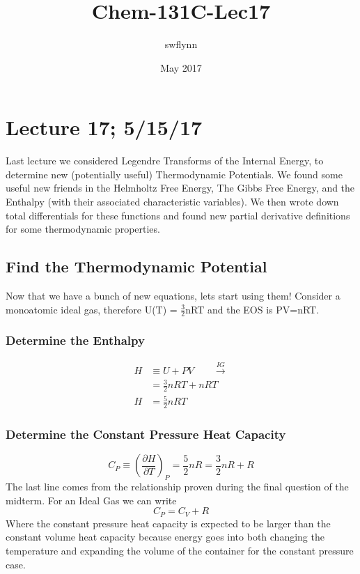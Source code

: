 \documentclass{article}
\title{Chem-131C-Lec17}
\author{swflynn}
\date{May 2017}
\begin{document}
\maketitle

\section*{Lecture 17; 5/15/17}
Last lecture we considered Legendre Transforms of the Internal Energy, to determine new (potentially useful) Thermodynamic Potentials.
We found some useful new friends in the Helmholtz Free Energy, The Gibbs Free Energy, and the Enthalpy (with their associated characteristic variables).
We then wrote down total differentials for these functions and found new partial derivative definitions for some thermodynamic properties. 

\subsection*{Find the Thermodynamic Potential}
Now that we have a bunch of new equations, lets start using them!
Consider a monoatomic ideal gas, therefore U(T) = $\frac{3}{2}$nRT and the EOS is PV=nRT.

\subsubsection*{Determine the Enthalpy}
\begin{equation}
    \begin{split}
        H &\equiv  U + PV \qquad \xrightarrow{IG} \\
        &= \frac{3}{2}nRT + nRT \\
        H &= \frac{5}{2}nRT
    \end{split}
\end{equation}

\subsubsection*{Determine the Constant Pressure Heat Capacity}
\begin{equation}
    C_P \equiv \left(\frac{\partial H}{\partial T}\right)_P = \frac{5}{2}nR = \frac{3}{2}nR + R
\end{equation}
The last line comes from the relationship proven during the final question of the midterm.
For an Ideal Gas we can write 
\begin{equation}
    C_P = C_V + R
\end{equation}
Where the constant pressure heat capacity is expected to be larger than the constant volume heat capacity because energy goes into both changing the temperature and expanding the volume of the container for the constant pressure case. 
\end{document}
